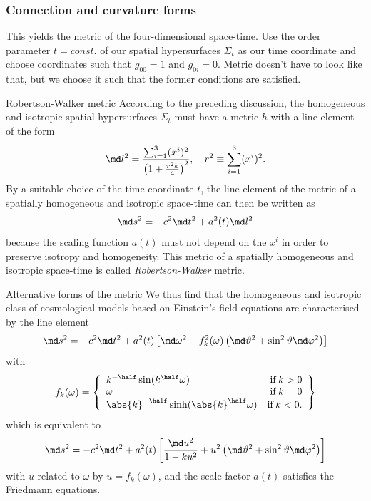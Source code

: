 	\subsubsection{Connection and curvature forms}
	This yields the metric of the four-dimensional space-time. Use the order parameter $t=const.$ of our spatial hypersurfaces $\Sigma_t$ as our time coordinate and choose coordinates such that $g_{00}=1$ and $g_{0i}=0$. Metric doesn't have to look like that, but we choose it such that the former conditions are satisfied.	
	\begin{mybox}{Robertson-Walker metric}
		According to the preceding discussion, the homogeneous and isotropic
		spatial hypersurfaces $\Sigma_t$ must have a metric $h$ with a line element of the
		form
		\begin{equation}
			\md l^2 = \frac{\sum_{i=1}^{3}(x^i)^2}{\left(1+\frac{r^2k}{4}\right)^2}, \quad r^2 \equiv \sum_{i=1}^{3} (x^i)^2.
		\end{equation}
		By a suitable choice of the time coordinate $t$, the line element of the
		metric of a spatially homogeneous and isotropic space-time can then
		be written as
		\begin{equation}
		\label{eq:metricRobertsonWalkerViaField}
			\md s^2 = -c^2 \md t^2 + a^2(t) \md l^2
		\end{equation}
		because the scaling function $a(t)$ must not depend on the $x^i$ in order to
		preserve isotropy and homogeneity. This metric  of a spatially
		homogeneous and isotropic space-time is called \emph{Robertson-Walker}
		metric.
	\end{mybox}
	\begin{mybox}{Alternative forms of the metric}
		We thus find that the homogeneous and isotropic class of cosmological
		models based on Einstein’s field equations are characterised by the line
		element
		\begin{equation}
			\md s^2 = -c^2 \md t^2 + a^2(t) \left[\md \omega^2 + f^2_k(\omega) \left(\md \vartheta^2 + \sin^2 \vartheta \md \varphi^2\right)\right]
		\end{equation}
		with 
		\begin{equation}
			f_k(\omega)=\left\{	\begin{array}{lr}
			{k}^{- \half} \sin(k^{\half} \omega) & \mathrm{if} \, k>0\\
			\omega 												& 			\mathrm{ if} \, k=0 \\
			\abs{k}^{- \half} \sinh( \abs{k}^{ \half} \omega) & \mathrm{if} \, k<0.
			\end{array}			\right\}
		\end{equation}
		which is equivalent to
	\begin{equation}
		\md s^2 = -c^2\md t^2 + a^2(t) \left[ \frac{\md u^2}{1 - k u^2} +u^2\left( \md \vartheta^2 + \sin^2\vartheta \md \varphi^2 \right)\right]
	\end{equation}
		with $u$ related to $\omega$ by $u=f_k(\omega)$, and the scale factor $a(t)$ satisfies the
		Friedmann equations.
	\end{mybox}
